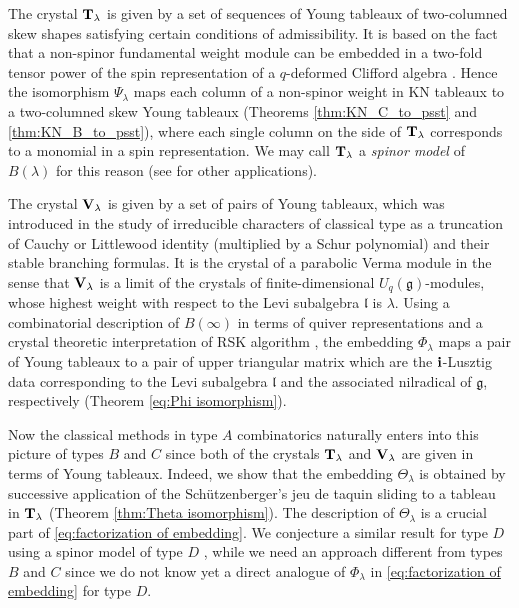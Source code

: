 \documentclass[leqno,11pt]{amsart}
\numberwithin{equation}{section}
\newcommand{\bs}{\boldsymbol}
\newcommand{\bi}{\bs{\rm i}}
\newcommand{\g}{\mathfrak{g}}
\newcommand{\mf}{\mathfrak}
\newcommand{\la}{\lambda}
\begin{document}
The crystal ${\bf T}_\la$ is given by a set of sequences of Young tableaux of two-columned skew shapes satisfying certain conditions of admissibility. It is based on the fact that a non-spinor fundamental weight module can be embedded in a two-fold tensor power of the spin representation of a $q$-deformed Clifford algebra \cite{Ha}. Hence the isomorphism $\Psi_\la$ maps each column of a non-spinor weight in KN tableaux to a two-columned skew Young tableaux (Theorems \ref{thm:KN_C_to_psst} and \ref{thm:KN_B_to_psst}), where each single column on the side of ${\bf T}_\la$ corresponds to a monomial in a spin representation. We may call ${\bf T}_\la$ a {\em spinor model} of $B(\la)$ for this reason (see \cite{K15-1,K15,K16} for other applications). %

The crystal ${\bf V}_\la$ is given by a set of pairs of Young tableaux, which was introduced in the study of irreducible characters of classical type as a truncation of Cauchy or Littlewood identity (multiplied by a Schur polynomial) and their stable branching formulas. 
It is the crystal of a parabolic Verma module in the sense that ${\bf V}_\la$ is a limit of the crystals of finite-dimensional $U_q(\g)$-modules, whose highest weight with respect to the Levi subalgebra $\mf l$ is $\la$.
Using a combinatorial description of $B(\infty)$ in terms of quiver representations \cite{Re} and a crystal theoretic interpretation of RSK algorithm \cite{K09}, the embedding $\Phi_\la$ maps a pair of Young tableaux to a pair of upper triangular matrix which are the $\bi$-Lusztig data corresponding to the Levi subalgebra $\mf l$ and the associated nilradical of $\g$, respectively (Theorem \ref{eq:Phi isomorphism}).

Now the classical methods in type $A$ combinatorics naturally enters into this picture of types $B$ and $C$ since both of the crystals ${\bf T}_\la$ and ${\bf V}_\la$ are given in terms of Young tableaux. 
Indeed, we show that the embedding $\Theta_\la$ is obtained by successive application of the Sch\"{u}tzenberger's jeu de taquin sliding to a tableau in ${\bf T}_\la$ (Theorem \ref{thm:Theta isomorphism}). The description of $\Theta_\la$ is a crucial part of \eqref{eq:factorization of embedding}. 
We conjecture a similar result for type $D$ using a spinor model of type $D$ \cite{K16}, while we need an approach different from types $B$ and $C$ since we do not know yet a direct analogue of $\Phi_\la$ in \eqref{eq:factorization of embedding} for type $D$. 
\end{document}
